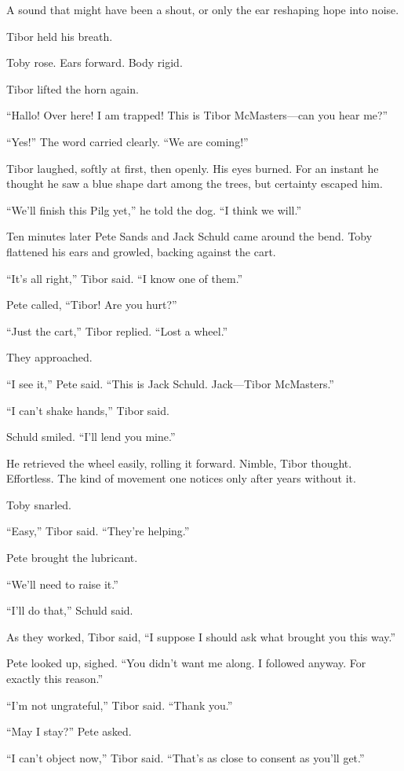 A sound that might have been a shout, or only the ear reshaping hope into noise.

Tibor held his breath.

Toby rose. Ears forward. Body rigid.

Tibor lifted the horn again.

“Hallo! Over here! I am trapped! This is Tibor McMasters—can you hear me?”

“Yes!” The word carried clearly. “We are coming!”

Tibor laughed, softly at first, then openly. His eyes burned. For an instant he thought he saw a blue shape dart among the trees, but certainty escaped him.

“We’ll finish this Pilg yet,” he told the dog. “I think we will.”

Ten minutes later Pete Sands and Jack Schuld came around the bend. Toby flattened his ears and growled, backing against the cart.

“It’s all right,” Tibor said. “I know one of them.”

Pete called, “Tibor! Are you hurt?”

“Just the cart,” Tibor replied. “Lost a wheel.”

They approached.

“I see it,” Pete said. “This is Jack Schuld. Jack—Tibor McMasters.”

“I can’t shake hands,” Tibor said.

Schuld smiled. “I’ll lend you mine.”

He retrieved the wheel easily, rolling it forward. Nimble, Tibor thought. Effortless. The kind of movement one notices only after years without it.

Toby snarled.

“Easy,” Tibor said. “They’re helping.”

Pete brought the lubricant.

“We’ll need to raise it.”

“I’ll do that,” Schuld said.

As they worked, Tibor said, “I suppose I should ask what brought you this way.”

Pete looked up, sighed. “You didn’t want me along. I followed anyway. For exactly this reason.”

“I’m not ungrateful,” Tibor said. “Thank you.”

“May I stay?” Pete asked.

“I can’t object now,” Tibor said. “That’s as close to consent as you’ll get.”

